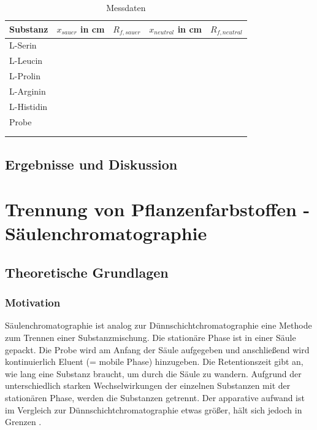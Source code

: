 \documentclass{article}
\begin{document}
        \begin{table}[H]
          \centering
          \caption[Messdaten, Quelle: Autor]{Messdaten}
          \label{tab:Messdaten}
            \begin{tabular}{@{}l|ll|ll@{}}
              \toprule
               Substanz & $x_{sauer}$ in \si{\centi\meter} & $R_{f,sauer}$ & $x_{neutral}$ in \si{\centi\meter} & $R_{f,neutral}$ \\ \midrule
               L-Serin &  & & \\
               L-Leucin &  &  &  \\
               L-Prolin &  &  &  \\
               L-Arginin &  &  &  \\
               L-Histidin &  &  &  \\ \midrule
               Probe &  &  &  \\
                     &  &  &  \\
                     &  &  &  \\ \bottomrule
            \end{tabular}
         \end{table}      
      
    \subsection{Ergebnisse und Diskussion}
  
  \section{Trennung von Pflanzenfarbstoffen - Säulenchromatographie}
  
    \subsection{Theoretische Grundlagen}
    
      \subsubsection{Motivation} \label{sec:Motivationzwei}
      
        Säulenchromatographie ist analog zur Dünnschichtchromatographie eine Methode zum Trennen einer Substanzmischung. Die stationäre Phase ist in einer Säule gepackt. Die Probe wird am Anfang der Säule aufgegeben und anschließend wird kontinuierlich Eluent (= mobile Phase) hinzugeben. Die Retentionszeit gibt an, wie lang eine Substanz braucht, um durch die Säule zu wandern. Aufgrund der unterschiedlich starken Wechselwirkungen der einzelnen Substanzen mit der stationären Phase, werden die Substanzen getrennt. Der apparative aufwand ist im Vergleich zur Dünnschichtchromatographie etwas größer, hält sich jedoch in Grenzen \cite[S. 154]{TaschenatlasAnallytik}.\\
        
\end{document}
